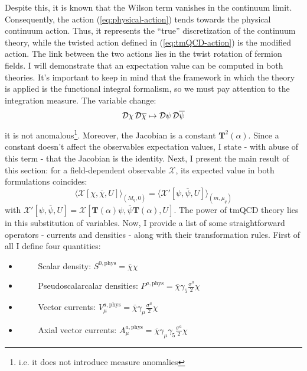 \documentclass[english, LaM, oneside, noexaminfo]{sapthesis}
\newcommand{\la}{\langle}
\newcommand{\ra}{\rangle}
\begin{document}
Despite this, it is known \cite{montvay-munster} that the Wilson term vanishes in the continuum limit.
Consequently, the action (\ref{eq:physical-action}) tends towards the physical continuum action.
Thus, it represents the ``true'' discretization of the continuum theory, while the twisted action defined in (\ref{eq:tmQCD-action}) is the modified action.
\newline
The link between the two actions lies in the twist rotation of fermion fields.
I will demonstrate that an expectation value can be computed in both theories.
It's important to keep in mind that the framework in which the theory is applied is the functional integral formalism, so we must pay attention to the integration measure.
The variable change:
\begin{equation*}
    \mathcal{D}\chi \hspace*{0.5mm} \mathcal{D}\overline{\chi} \mapsto \mathcal{D}\psi \hspace*{0.5mm} \mathcal{D}\overline{\psi}
\end{equation*}
it is not anomalous\footnote{i.e. it does not introduce measure anomalies}.
Moreover, the Jacobian is a constant $\mathbf{T}^2(\alpha)$.
Since a constant doesn't affect the observables expectation values, I state - with abuse of this term - that the Jacobian is the identity.
Next, I present the main result of this section: for a field-dependent observable $\mathcal{X}$, its expected value in both formulations coincides:
\begin{equation*}
    \la \mathcal{X} [\chi, \overline{\chi}, U] \ra_{(M_q,0)} = \la \mathcal{X}' [\psi, \overline{\psi}, U] \ra_{(m,\mu_q)}
\end{equation*}
with $\mathcal{X}' [\psi, \overline{\psi}, U] = \mathcal{X} [\mathbf{T}(\alpha)\psi, \overline{\psi}\mathbf{T}(\alpha), U]$.
The power of tmQCD theory lies in this substitution of variables.
\newline
Now, I provide a list of some straightforward operators - currents and densities - along with their transformation rules.
First of all I define four quantities:
\begin{itemize}
    \item [] $\qquad$ Scalar density: \hspace*{5mm} $S^{0,\text{phys}} = \bar\chi \chi$
    \item [] $\qquad$ Pseudoscalarcalar densities: \hspace*{5mm} $P^{a,\text{phys}} = \bar\chi \gamma_5 \frac{\sigma^a}{2} \chi$
    \item [] $\qquad$ Vector currents: \hspace*{5mm} $V_{\mu}^{a,\text{phys}} = \bar\chi \gamma_\mu \frac{\sigma^a}{2} \chi$
    \item [] $\qquad$ Axial vector currents: \hspace*{5mm} $A_\mu^{a,\text{phys}} = \bar\chi \gamma_\mu \gamma_5 \frac{\sigma^a}{2} \chi$
\end{itemize}
\end{document}

